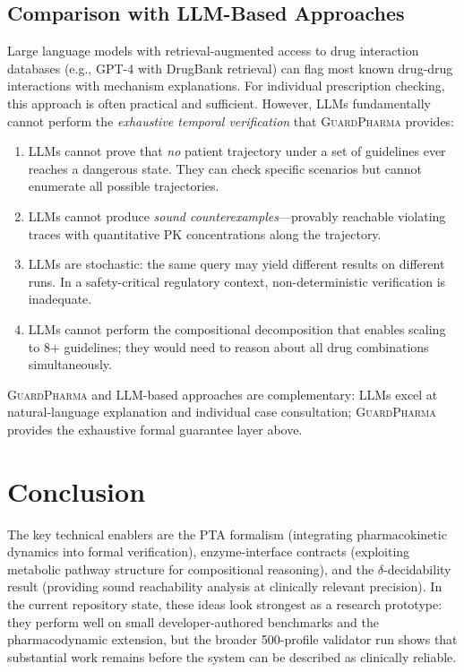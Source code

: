 \documentclass{article}
\theoremstyle{definition}
\begin{document}
\subsection{Comparison with LLM-Based Approaches}

Large language models with retrieval-augmented access to drug interaction databases (e.g., GPT-4 with DrugBank retrieval) can flag most known drug-drug interactions with mechanism explanations. For individual prescription checking, this approach is often practical and sufficient. However, LLMs fundamentally cannot perform the \emph{exhaustive temporal verification} that \textsc{GuardPharma} provides:

\begin{enumerate}
\item LLMs cannot prove that \emph{no} patient trajectory under a set of guidelines ever reaches a dangerous state. They can check specific scenarios but cannot enumerate all possible trajectories.
\item LLMs cannot produce \emph{sound counterexamples}---provably reachable violating traces with quantitative PK concentrations along the trajectory.
\item LLMs are stochastic: the same query may yield different results on different runs. In a safety-critical regulatory context, non-deterministic verification is inadequate.
\item LLMs cannot perform the compositional decomposition that enables scaling to 8+ guidelines; they would need to reason about all drug combinations simultaneously.
\end{enumerate}

\textsc{GuardPharma} and LLM-based approaches are complementary: LLMs excel at natural-language explanation and individual case consultation; \textsc{GuardPharma} provides the exhaustive formal guarantee layer above.

\section{Conclusion}
\label{sec:conclusion}


The key technical enablers are the PTA formalism (integrating pharmacokinetic dynamics into formal verification), enzyme-interface contracts (exploiting metabolic pathway structure for compositional reasoning), and the $\delta$-decidability result (providing sound reachability analysis at clinically relevant precision). In the current repository state, these ideas look strongest as a research prototype: they perform well on small developer-authored benchmarks and the pharmacodynamic extension, but the broader 500-profile validator run shows that substantial work remains before the system can be described as clinically reliable.
\end{document}
